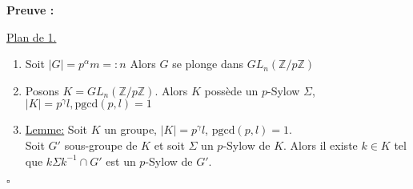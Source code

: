 \documentclass{report}
\renewenvironment{leftbar}{%
  \def\FrameCommand{\vrule width 0.4pt \hspace{10pt}}%
  \MakeFramed {\advance\hsize-\width \FrameRestore}}%
 {\endMakeFramed}%
\newenvironment{preuve}{\vspace*{0.5cm}
    \begin{leftbar}
    \noindent\textbf{Preuve :}\par}{
    \begin{flushright}
    $\square$
    \end{flushright}
    \end{leftbar}
}
\newcommand{\Z}{\mathbb{Z}}
\begin{document}
\begin{preuve}
    \underline{Plan de 1.}
    \begin{enumerate}
        \item Soit $|G| = p^{\alpha}m =: n$ Alors $G$ se plonge dans $GL_n(\Z / p\Z)$
        \item Posons $K = GL_n(\Z / p\Z).$ Alors $K$ possède un $p$-Sylow $\Sigma$, $|K| = p^{\gamma}l, \text{pgcd}(p,l) = 1$
    \item \underline{Lemme:} Soit $K$ un groupe, $|K| = p^{\gamma}l$, $\text{pgcd}(p,l) = 1$.\\
    Soit $G'$ sous-groupe de $K$ et soit $\Sigma$ un $p$-Sylow de $K$. Alors il existe $k \in K$ tel que $k \Sigma k^{-1} \cap G'$ est un $p$-Sylow de $G'$.
    \end{enumerate}
\end{preuve}
\end{document}
